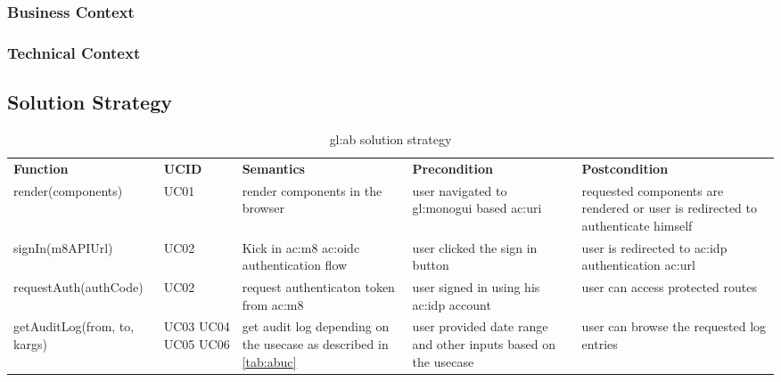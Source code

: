 \subsubsection{Business Context}


\subsubsection{Technical Context}



\subsection{Solution Strategy}


\begin{table}[H]
  \begin{center}
    \label{tab:abss}
    \def\arraystretch{1.5}
    \begin{tabularx}{\linewidth}{| X m{1cm} X X X |}
      \hline
      \rowcolor{gray!20}
      \textbf{Function} & \textbf{UCID} & \textbf{Semantics} & \textbf{Precondition} & \textbf{Postcondition}\\

      render(\-components) & UC01 & render components in the browser & user navigated to \gls{gl:monogui} based \gls{ac:uri} & requested components are rendered or user is redirected to authenticate himself \\

      signIn(\-m8APIUrl) & UC02 & Kick in \gls{ac:m8} \gls{ac:oidc} authentication flow & user clicked the sign in button & user is redirected to \gls{ac:idp} authentication \gls{ac:url} \\

      requestAuth(\-authCode) & UC02 & request authenticaton token from \gls{ac:m8} & user signed in using his \gls{ac:idp} account & user can access protected routes \\

      getAuditLog(\-from, to, kargs) & UC03 UC04 UC05 UC06 & get audit log depending on the usecase as described in \ref{tab:abuc} & user provided date range and other inputs based on the usecase & user can browse the requested log entries \\

      \hline
    \end{tabularx}
  \end{center}
  \caption{\Gls{gl:ab} solution strategy}
\end{table}

